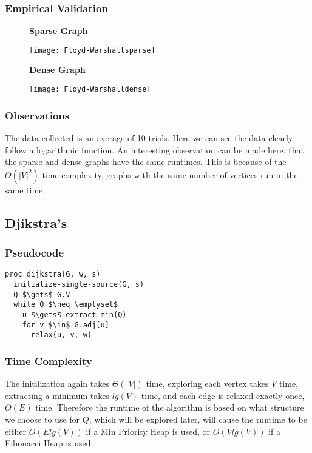 \documentclass[a4paper,12pt]{article}
\begin{document}
\subsubsection{Empirical Validation}
\begin{figure}[H]
  \centering
  \textbf{Sparse Graph}\par\medskip
  \texttt{[image: Floyd-Warshallsparse]}
\end{figure}
\begin{figure}[H]
  \centering
  \textbf{Dense Graph}\par\medskip
  \texttt{[image: Floyd-Warshalldense]}
\end{figure}
\subsubsection{Observations}
The data collected is an average of 10 trials. Here we can see the data clearly follow a logarithmic function. An interesting observation can be made here, that the sparse and dense graphs have the same runtimes. This is because of the $\Theta(|V|^2)$ time complexity, graphs with the same number of vertices run in the same time.
\subsection{Djikstra's}
\subsubsection{Pseudocode}
\begin{lstlisting}[mathescape=true]
proc dijkstra(G, w, s)
  initialize-single-source(G, s)
  Q $\gets$ G.V
  while Q $\neq \emptyset$
    u $\gets$ extract-min(Q)
    for v $\in$ G.adj[u]
      relax(u, v, w)
\end{lstlisting}
\subsubsection{Time Complexity}
The initilization again takes $\Theta(|V|)$ time, exploring each vertex takes $V$ time, extracting a minimum takes $lg(V)$ time, and each edge is relaxed exactly once, $O(E)$ time. Therefore the runtime of the algorithm is based on what structure we choose to use for $Q$, which will be explored later, will cause the runtime to be either $O(Elg(V))$ if a Min Priority Heap is used, or $O(Vlg(V))$ if a Fibonacci Heap is used.
\end{document}
